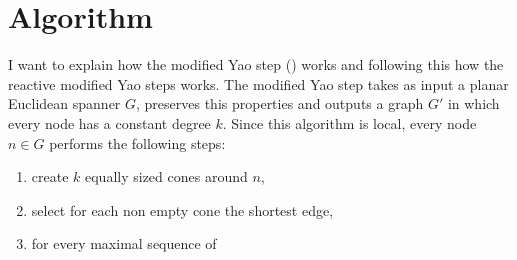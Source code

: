 \section{Algorithm}

I want to explain how the modified Yao step (\cite{kanj}) works and following this how the reactive modified Yao steps works.
The modified Yao step takes as input a planar Euclidean spanner $G $, preserves this properties and outputs a graph $G' $ in which every node has a constant degree $k $.
Since this algorithm is local, every node $n\in G $ performs the following steps:

\begin{enumerate}
\item create $k $ equally sized cones around $n $,
\item select for each non empty cone the shortest edge,
\item for every maximal sequence of 
\end{enumerate}